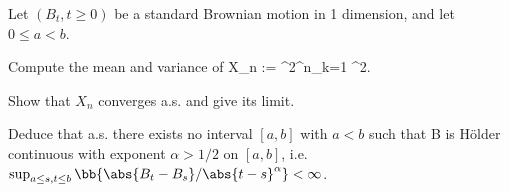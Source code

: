 %
%
%
%
%
%
%
%


\item Let $(B_t, t \geq  0)$ be a standard Brownian motion in 1 dimension, and let $0 \leq a < b$.
\ben
\item [(i)] Compute the mean and variance of
\be
X_n := \sum^{2^n}_{k=1} ^2.
\ee

\item [(ii)] Show that $X_n$ converges a.s. and give its limit.
\item [(iii)] Deduce that a.s. there exists no interval $[a, b]$ with $a < b$ such that B is H\"older continuous with exponent $\alpha > 1/2$ on $[a, b]$, i.e. $\sup_{a\leq s,t\leq b} \bb{\abs{B_t - B_s}/\abs{t - s}^\alpha} < \infty$.
\een

